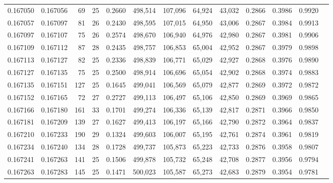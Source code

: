 \begin{tabular}{rrrrrrrrrrrrr}
0.167050 & 0.167056 &  69 &  25 &                                     0.2660 & 498,514 & 107,096 &  64,924 &  43,032 & 0.2866 & 0.3986 & 0.9920 \\
0.167057 & 0.167097 &  81 &  26 &                                     0.2430 & 498,595 & 107,015 &  64,950 &  43,006 & 0.2867 & 0.3984 & 0.9913 \\
0.167097 & 0.167107 &  75 &  26 &                                     0.2574 & 498,670 & 106,940 &  64,976 &  42,980 & 0.2867 & 0.3981 & 0.9906 \\
0.167109 & 0.167112 &  87 &  28 &                                     0.2435 & 498,757 & 106,853 &  65,004 &  42,952 & 0.2867 & 0.3979 & 0.9898 \\
0.167113 & 0.167127 &  82 &  25 &                                     0.2336 & 498,839 & 106,771 &  65,029 &  42,927 & 0.2868 & 0.3976 & 0.9890 \\
0.167127 & 0.167135 &  75 &  25 &                                     0.2500 & 498,914 & 106,696 &  65,054 &  42,902 & 0.2868 & 0.3974 & 0.9883 \\
0.167135 & 0.167151 & 127 &  25 &                                     0.1645 & 499,041 & 106,569 &  65,079 &  42,877 & 0.2869 & 0.3972 & 0.9872 \\
0.167152 & 0.167165 &  72 &  27 &                                     0.2727 & 499,113 & 106,497 &  65,106 &  42,850 & 0.2869 & 0.3969 & 0.9865 \\
0.167166 & 0.167180 & 161 &  33 &                                     0.1701 & 499,274 & 106,336 &  65,139 &  42,817 & 0.2871 & 0.3966 & 0.9850 \\
0.167181 & 0.167209 & 139 &  27 &                                     0.1627 & 499,413 & 106,197 &  65,166 &  42,790 & 0.2872 & 0.3964 & 0.9837 \\
0.167210 & 0.167233 & 190 &  29 &                                     0.1324 & 499,603 & 106,007 &  65,195 &  42,761 & 0.2874 & 0.3961 & 0.9819 \\
0.167234 & 0.167240 & 134 &  28 &                                     0.1728 & 499,737 & 105,873 &  65,223 &  42,733 & 0.2876 & 0.3958 & 0.9807 \\
0.167241 & 0.167263 & 141 &  25 &                                     0.1506 & 499,878 & 105,732 &  65,248 &  42,708 & 0.2877 & 0.3956 & 0.9794 \\
0.167263 & 0.167283 & 145 &  25 &                                     0.1471 & 500,023 & 105,587 &  65,273 &  42,683 & 0.2879 & 0.3954 & 0.9781 \\

\end{tabular}
